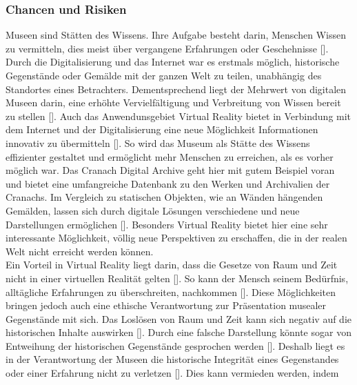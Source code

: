 \documentclass[a4paper,12pt,oneside]{article}
\begin{document}
      \subsubsection{Chancen und Risiken}
        Museen sind Stätten des Wissens. Ihre Aufgabe besteht darin, Menschen Wissen zu
        vermitteln, dies meist über vergangene Erfahrungen oder Geschehnisse [\cite[24]{fischer2001}].
        Durch die Digitalisierung und das Internet war es erstmals möglich, historische Gegenstände
        oder Gemälde mit der ganzen Welt zu teilen, unabhängig des Standortes eines
        Betrachters. Dementsprechend liegt der Mehrwert von digitalen Museen darin, eine
        erhöhte Vervielfältigung und Verbreitung von Wissen bereit zu stellen [\cite[17]{Huennekens2002}].
        Auch das Anwendunsgebiet Virtual Reality bietet in Verbindung mit dem Internet und der Digitalisierung
        eine neue Möglichkeit Informationen innovativ zu übermitteln [\cite[52]{Heidsiek2019}].
        So wird das Museum als Stätte des Wissens effizienter gestaltet und ermöglicht 
        mehr Menschen
        zu erreichen, als es vorher möglich war. Das Cranach Digital Archive geht hier mit
        gutem Beispiel voran und bietet eine umfangreiche Datenbank
        zu den Werken und Archivalien der Cranachs.
        Im Vergleich zu statischen Objekten, wie an Wänden hängenden Gemälden, lassen sich 
        durch digitale Lösungen verschiedene und neue Darstellungen ermöglichen [\cite[17]{Huennekens2002}].
        Besonders Virtual Reality bietet hier eine sehr interessante Möglichkeit, völlig neue
        Perspektiven zu erschaffen, die in der realen Welt nicht erreicht werden können. \\
        Ein Vorteil in Virtual Reality liegt darin, dass die Gesetze von Raum und Zeit nicht
        in einer virtuellen Realität gelten [\cite[140]{Huennekens2002}]. So kann der Mensch
        seinem Bedürfnis, alltägliche Erfahrungen zu überschreiten, nachkommen [\cite[140]{Huennekens2002}].
        Diese Möglichkeiten bringen jedoch auch eine ethische 
        Verantwortung zur Präsentation musealer Gegenstände mit sich.
        Das Loslösen von Raum und Zeit kann sich negativ auf die historischen Inhalte auswirken
        [\cite[141]{Huennekens2002}]. Durch eine falsche Darstellung könnte 
        sogar von Entweihung der historischen
        Gegenstände gesprochen werden [\cite[141]{Huennekens2002}]. Deshalb liegt es in der 
        Verantwortung der
        Museen die historische Integrität eines Gegenstandes oder einer Erfahrung nicht
        zu verletzen [\cite[38]{Heidsiek2019}]. Dies kann vermieden werden, indem 
\end{document}
